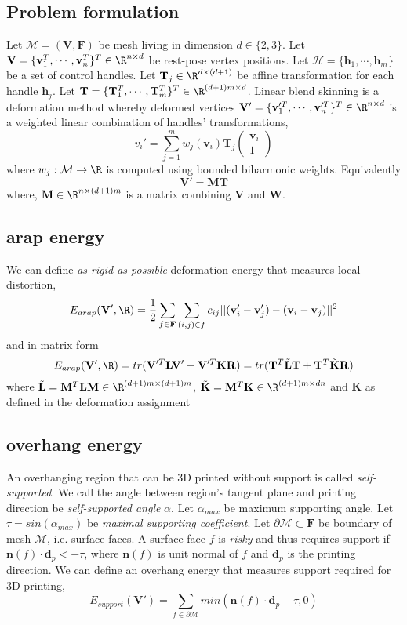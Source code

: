 \documentclass[12pt]{article}
\newcommand{\calM}{\mathcal{M}}
\newcommand{\calH}{\mathcal{H}}
\newcommand{\bL}{\mathbf{L}}
\newcommand{\bV}{\mathbf{V}}
\newcommand{\bF}{\mathbf{F}}
\newcommand{\bR}{\mathbf{R}}
\newcommand{\bW}{\mathbf{W}}
\newcommand{\bM}{\mathbf{M}}
\newcommand{\bT}{\mathbf{T}}
\newcommand{\bv}{\mathbf{v}}
\newcommand{\bh}{\mathbf{h}}
\newcommand{\bK}{\mathbf{K}}
\newcommand{\bn}{\mathbf{n}}
\newcommand{\bd}{\mathbf{d}}
\begin{document}
\subsection*{Problem formulation}

Let $\calM = (\bV, \bF)$ be mesh living in dimension $d\in \{2,3\}$. Let $\bV = \{\bv_1^T, \cdots, \bv_n^T\}^T \in \R^{n \times d}$ be rest-pose vertex positions. Let $\calH = \{ \bh_1, \cdots, \bh_m \}$ be a set of control handles. Let $\bT_j \in \R^{d \times (d+1)}$ be affine transformation for each handle $\bh_j$. Let $\bT = \{ \bT_1^T, \cdots, \bT_m^T \}^T \in \R^{(d+1)m \times d}$. Linear blend skinning is a deformation method whereby deformed vertices $\bV' = \{ \bv_1'^T, \cdots, \bv_n'^T \}^T \in \R^{n\times d}$ is a weighted linear combination of handles' transformations,
\[
    v_i' = \sum_{j=1}^m w_j(\bv_i) \bT_j  \begin{pmatrix} \bv_i \\ 1 \end{pmatrix} 
\]
where $w_j: \calM \rightarrow \R$ is computed using bounded biharmonic weights. Equivalently
\[
    \bV' = \bM \bT
\]
where,  $\bM \in \R^{n \times (d+1)m}$ is a matrix combining $\bV$ and $\bW$. 

\subsection*{arap energy}

We can define \textit{as-rigid-as-possible} deformation energy that measures local distortion,
\[
    E_{arap}(\bV', \R) = \frac{1}{2} \sum_{f\in \bF} \sum_{(i,j)\in f} c_{ij} || (\bv_i' - \bv_j') - (\bv_i - \bv_j) ||^2
\]
and in matrix form
\[
    E_{arap}(\bV', \R) 
    = tr(\bV'^T \bL \bV' + \bV'^T \bK \bR )
    = tr(\bT^T \tilde{\bL} \bT + \bT^T \tilde{\bK} \bR)
\]
where $\tilde{\bL} = \bM^T \bL \bM \in \R^{(d+1)m \times (d+1)m}$, $\tilde{\bK} = \bM^T \bK \in \R^{(d+1)m \times dn}$ and $\bK$ as defined in the deformation assignment

\subsection*{overhang energy}

An overhanging region that can be 3D printed without support is called \textit{self-supported}. We call the angle between region's tangent plane and printing direction be \textit{self-supported angle} $\alpha$. Let $\alpha_{max}$ be maximum supporting angle. Let $\tau = sin(\alpha_{max})$ be \textit{maximal supporting coefficient}. Let $\partial \calM \subset \bF$ be boundary of mesh $\calM$, i.e. surface faces. A surface face $f$ is \textit{risky} and thus requires support if $\bn(f) \cdot \bd_{p} < -\tau$, where $\bn(f)$ is unit normal of $f$ and $\bd_{p}$ is the printing direction. We can define an overhang energy that measures support required for 3D printing,
\[
    E_{support}(\bV') = \sum_{f\in \partial \calM} min(\bn(f) \cdot \bd_{p} - \tau, 0)
\]
\end{document}
